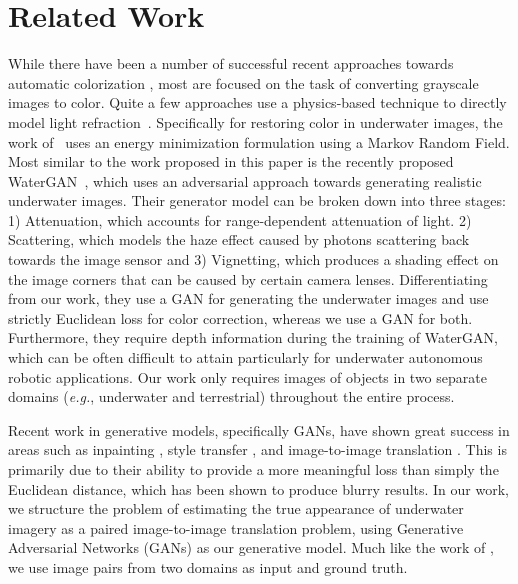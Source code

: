 \section{Related Work}
\label{sec:related}

While there have been a number of successful recent approaches towards automatic colorization 
\cite{zhang2016colorful,iizuka2016let}, most are focused on the task of converting grayscale images to color. Quite a few 
approaches use a physics-based technique to directly model light refraction~\cite{jordt2014underwater}. Specifically for
restoring color in underwater images, the work of~\cite{torres2005color} uses an energy minimization formulation using a Markov 
Random Field. Most similar to the work proposed in this paper is the recently proposed WaterGAN~\cite{li2017watergan}, 
which uses an adversarial approach towards generating realistic underwater images. Their generator model can be broken down into 
three stages: 1) Attenuation, which accounts for range-dependent attenuation of light. 2) Scattering, which models the haze 
effect caused by photons scattering back towards the image sensor and 3) Vignetting, which produces a shading effect on the 
image corners that can be caused by certain camera lenses. Differentiating from our work, they use a GAN for generating the 
underwater images and use strictly Euclidean loss for color correction, whereas we use a GAN for both. Furthermore, they require 
depth information during the training of WaterGAN, which can be often difficult to attain particularly for underwater 
autonomous robotic applications. Our work only requires images of objects in two separate domains (\emph{e.g.}, underwater 
and terrestrial) throughout the entire process.

Recent work in generative models, specifically GANs, have shown great success in areas such as inpainting 
\cite{pathak2016context}, style transfer \cite{Gatys_2016_CVPR}, and image-to-image translation 
\cite{isola2016image,zhu2017unpaired}. This is primarily due to their ability to provide a more meaningful loss than simply the 
Euclidean distance, which has been shown to produce blurry results. In our work, we structure the problem of estimating 
the true appearance of underwater imagery as a paired image-to-image translation problem, using Generative Adversarial Networks 
(GANs) as our generative model. Much like the work of \cite{isola2016image}, we 
use image pairs from two domains as input and ground truth. 
